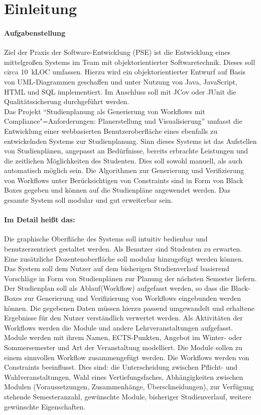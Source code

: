 \section{Einleitung}
\paragraph{Aufgabenstellung}
Ziel der Praxis der Software-Entwicklung (PSE) ist die Entwicklung eines mittelgroßen Systems im Team mit objektorientierter Softwaretechnik. Dieses soll circa 10~kLOC umfassen. Hierzu wird ein objektorientierter Entwurf auf Basis von UML-Diagrammen geschaffen und unter Nutzung von Java, JavaScript, HTML und SQL implementiert. Im Anschluss soll mit JCov oder JUnit die Qualitätssicherung durchgeführt werden.\\
Das Projekt \enquote{Studienplanung als Generierung von Workflows mit Compliance"=Anforderungen: Planerstellung und Visualisierung} umfasst die Entwicklung einer webbasierten Benutzeroberfläche eines ebenfalls zu entwickelnden Systems zur Studienplanung. Sinn dieses Systems ist das Aufstellen von Studienplänen, angepasst an Bedürfnisse, bereits erbrachte Leistungen und die zeitlichen Möglichkeiten des Studenten. Dies soll sowohl manuell, als auch automatisch möglich sein. Die Algorithmen zur Generierung und Verifizierung von Workflows unter Berücksichtigen von Constraints sind in Form von Black Boxes gegeben und können auf die Studienpläne angewendet werden. Das gesamte System soll modular und gut erweiterbar sein.\\
\paragraph{Im Detail heißt das:}
Die graphische Oberfläche des Systems soll intuitiv bedienbar und benutzerzentriert gestaltet werden. Als Benutzer sind Studenten zu erwarten. Eine zusätzliche Dozentenoberfläche soll modular hinzugefügt werden können. Das System soll dem Nutzer auf dem bisherigen Studienverlauf basierend Vorschläge in Form von Studienplänen zur Planung der nächsten Semester liefern. Der Studienplan soll als Ablauf(Workflow) aufgefasst werden, so dass die Black-Boxes zur Generierung und Verifizierung von Workflows eingebunden werden können. Die gegebenen Daten müssen hierzu passend umgewandelt und erhaltene Ergebnisse für den Nutzer verständlich verwertet werden. Als Aktivitäten der Workflows werden die Module und andere Lehrveranstaltungen aufgefasst. Module werden mit ihrem Namen, ECTS-Punkten, Angebot im Winter- oder Sommersemester und Art der Veranstaltung modelliert. Die Module sollen zu einem sinnvollen Workflow zusammengefügt werden. Die Workflows werden von Constraints beeinflusst. Dies sind: die Unterscheidung zwischen Pflicht- und Wahlveranstaltungen, Wahl eines Vertiefungsfaches, Abhängigkeiten zwischen Modulen (Voraussetzungen, Zusammenhänge, Überschneidungen), zur Verfügung stehende Semesteranzahl, gewünschte Module, bisheriger Studienverlauf, weitere gewünschte Eigenschaften.\\